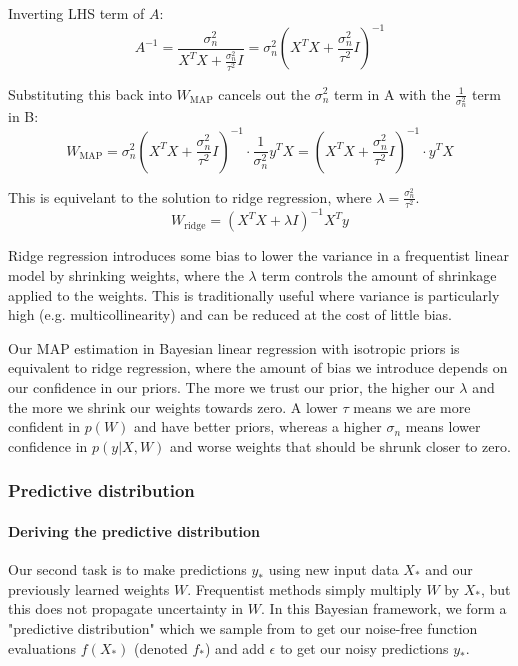 Inverting LHS term of $A$:
\begin{equation*}
    A^{-1} = \frac{\sigma_n^2}{X^TX + \frac{\sigma_n^2}{\tau^2}I} = \sigma_n^2\left(X^TX + \frac{\sigma_n^2}{\tau^2}I\right)^{-1}
\end{equation*}

Substituting this back into $W_\text{MAP}$ cancels out the $\sigma_n^2$ term in A with the $\frac{1}{\sigma_n^2}$ term in B:
\begin{equation*}
    W_{\text{MAP}} = \sigma_n^2\left(X^TX + \frac{\sigma_n^2}{\tau^2}I\right)^{-1} \cdot \frac{1}{\sigma_n^2}y^TX = \left(X^TX + \frac{\sigma_n^2}{\tau^2}I\right)^{-1} \cdot y^TX
\end{equation*}

This is equivelant to the solution to ridge regression, where $\lambda = \frac{\sigma_n^2}{\tau^2}$.
\begin{equation*}
    W_{\text{ridge}} = \left(X^TX + \lambda I\right)^{-1}X^Ty
\end{equation*}

Ridge regression introduces some bias to lower the variance in a frequentist linear model by shrinking weights, where the $\lambda$ term controls the amount of shrinkage applied to the weights. This is traditionally useful where variance is particularly high (e.g. multicollinearity) and can be reduced at the cost of little bias.  

Our MAP estimation in Bayesian linear regression with isotropic priors is equivalent to ridge regression, where the amount of bias we introduce depends on our confidence in our priors. The more we trust our prior, the higher our $\lambda$ and the more we shrink our weights towards zero. A lower $\tau$ means we are more confident in $p(W)$ and have better priors, whereas a higher $\sigma_n$ means lower confidence in $p(y|X,W)$ and worse weights that should be shrunk closer to zero.
        
\subsubsection{Predictive distribution}
\paragraph{Deriving the predictive distribution}
Our second task is to make predictions $y_*$ using new input data $X_*$ and our previously learned weights $W$. Frequentist methods simply multiply $\hat{W}$ by $X_*$, but this does not propagate uncertainty in $W$. In this Bayesian framework, we form a "predictive distribution" which we sample from to get our noise-free function evaluations $f(X_*)$ (denoted $f_*$) and add $\epsilon$ to get our noisy predictions $y_*$.

